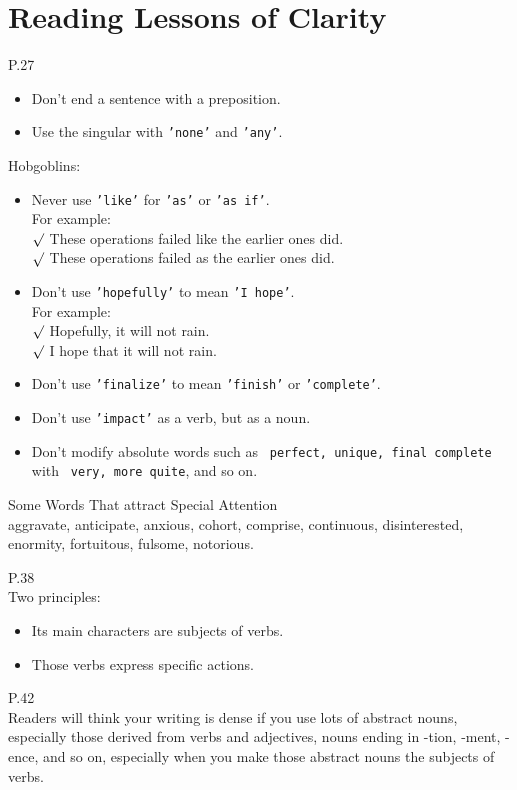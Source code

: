 \section{Reading Lessons of Clarity}
P.27\\
\begin{itemize}
\item Don't end a sentence with a preposition.
\item Use the singular with \texttt{'none'} and \texttt{'any'}.
\end{itemize}
Hobgoblins:
\begin{itemize}
\item Never use \texttt{'like'} for \texttt{'as'} or \texttt{'as if'}.\\
For example: \\
$\surd$ These operations failed like the earlier ones did.\\
$\surd$ These operations failed as the earlier ones did.
\item Don't use \texttt{'hopefully'} to mean \texttt{'I hope'}.\\
For example:\\
$\surd$ Hopefully, it will not rain.\\
$\surd$ I hope that it will not rain.
\item Don't use \texttt{'finalize'} to mean \texttt{'finish'} or \texttt{'complete'}.
\item Don't use \texttt{'impact'} as a verb, but as a noun.
\item Don't modify absolute words such as \texttt{ perfect, unique, final complete} with \texttt{ very, more
    quite}, and so on.
\end{itemize}

Some Words That attract Special Attention\\
aggravate, anticipate, anxious, cohort, comprise, continuous, disinterested, enormity, fortuitous, fulsome, 
notorious.

P.38\\
Two principles:
\begin{itemize}
\item Its main characters are subjects of verbs.
\item Those verbs express specific actions.
\end{itemize}
P.42\\
Readers will think your writing is dense if you use lots of abstract nouns, especially those derived from verbs and adjectives,
nouns ending in -tion, -ment, -ence, and so on, especially when you make those abstract nouns the subjects of verbs.


